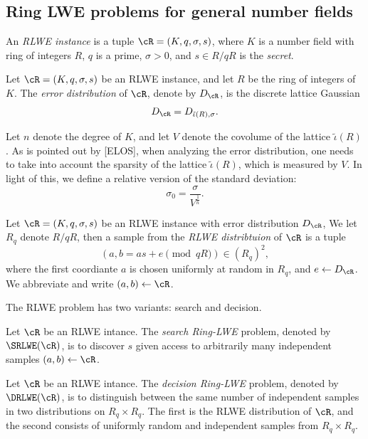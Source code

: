 \documentclass{amsart}
\begin{document}
\subsection{Ring LWE problems for general number fields}

\begin{Definition}
An {\it RLWE instance} is a tuple $\cR = (K,q,\sigma,s)$, where $K$ is a number field with ring of integers $R$, $q$ is a prime, $\sigma >0$, and $s \in R/qR$ is the {\it secret}.
\end{Definition}


\begin{Definition}
Let $\cR = (K,q,\sigma,s)$ be an RLWE instance, and let $R$ be the ring of integers of $K$. The {\it error distribution} of $\cR$, denote by $D_\cR$, is the discrete lattice Gaussian
\[
D_\cR = D_{\tilde{\iota}(R),\sigma}.
\]
\end{Definition}

Let $n$ denote the degree of $K$, and let $V$ denote the covolume of the lattice $\tilde{\iota}(R)$. As is pointed out by [ELOS], when analyzing the error distribution, one needs to take into account the sparsity of the lattice $\tilde{\iota}(R)$, which is measured by $V$. In light of this, we define a relative version of the standard deviation: $$\sigma_0 = \frac{\sigma}{V^{\frac{1}{n}}}.$$

\begin{Definition}
Let $\cR = (K,q,\sigma, s)$ be an RLWE instance with error distribution $D_\cR$, We let $R_q$ denote $R/qR$, then
a sample from the {\it RLWE distribtuion} of $\cR$ is a tuple
$$(a, b = as+e\pmod{qR}) \in (R_q)^2, $$
where the first coordiante $a$ is chosen uniformly at random in $R_q$, and $e \gets D_\cR$. We abbreviate and write $(a,b) \gets \cR$.
\end{Definition}

The RLWE problem has two variants: search and decision.

\begin{Definition}[Search]
Let $\cR$ be an RLWE intance. The {\it search Ring-LWE} problem, denoted by $\SRLWE(\cR)$, is to discover $s$ given access to arbitrarily many independent samples $(a,b) \gets \cR$.
\end{Definition}

\begin{Definition}[Decision]
Let $\cR$ be an RLWE intance. The {\it decision Ring-LWE}
problem, denoted by $\DRLWE(\cR)$, is to distinguish between the same number of independent samples in two distributions on $R_q \times R_q$. The first is the RLWE distribution of $\cR$, and the second consists of uniformly random and independent samples from $R_q \times R_q$.
\end{Definition}
\end{document}
